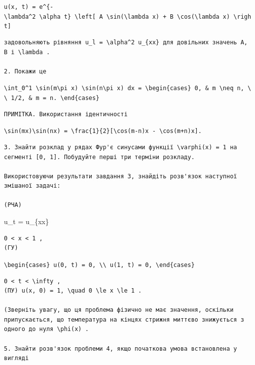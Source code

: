 \documentclass[
  ukrainian,
]{article}
\begin{document}
\texttt{u(x,\ t)\ =\ e\^{}\{-\textbackslash{}lambda\^{}2\ \textbackslash{}alpha\textquotesingle{}\ t\}\ \textbackslash{}left{[}\ A\ \textbackslash{}sin(\textbackslash{}lambda\ x)\ +\ B\ \textbackslash{}cos(\textbackslash{}lambda\ x)\ \textbackslash{}right{]}}

\begin{verbatim}
задовольняють рівняння u_l = \alpha^2 u_{xx} для довільних значень A, B і \lambda .

2. Покажи це
\end{verbatim}

\texttt{\textbackslash{}int\_0\^{}1\ \textbackslash{}sin(m\textbackslash{}pi\ x)\ \textbackslash{}sin(n\textbackslash{}pi\ x)\ dx\ =\ \textbackslash{}begin\{cases\}\ 0,\ \&\ m\ \textbackslash{}neq\ n,\ \textbackslash{}\textbackslash{}\ 1/2,\ \&\ m\ =\ n.\ \textbackslash{}end\{cases\}}

\begin{verbatim}
ПРИМІТКА. Використання ідентичності
\end{verbatim}

\texttt{\textbackslash{}sin(mx)\textbackslash{}sin(nx)\ =\ \textbackslash{}frac\{1\}\{2\}{[}\textbackslash{}cos(m-n)x\ -\ \textbackslash{}cos(m+n)x{]}.}

\begin{verbatim}
3. Знайти розклад у рядах Фур'є синусами функції \varphi(x) = 1 на сегменті [0, 1]. Побудуйте перші три терміни розкладу.

Використовуючи результати завдання 3, знайдіть розв'язок наступної змішаної задачі:

(PЧА)
\end{verbatim}

u\_t = u\_\{xx\}

\begin{verbatim}
0 < x < 1 , 
(ГУ)
\end{verbatim}

\texttt{\textbackslash{}begin\{cases\}\ u(0,\ t)\ =\ 0,\ \textbackslash{}\textbackslash{}\ u(1,\ t)\ =\ 0,\ \textbackslash{}end\{cases\}}

\begin{verbatim}
0 < t < \infty , 
(ПУ) u(x, 0) = 1, \quad 0 \le x \le 1 .

(Зверніть увагу, що ця проблема фізично не має значення, оскільки припускається, що температура на кінцях стрижня миттєво знижується з одного до нуля \phi(x) .

5. Знайти розв'язок проблеми 4, якщо початкова умова встановлена у вигляді
\end{verbatim}
\end{document}
